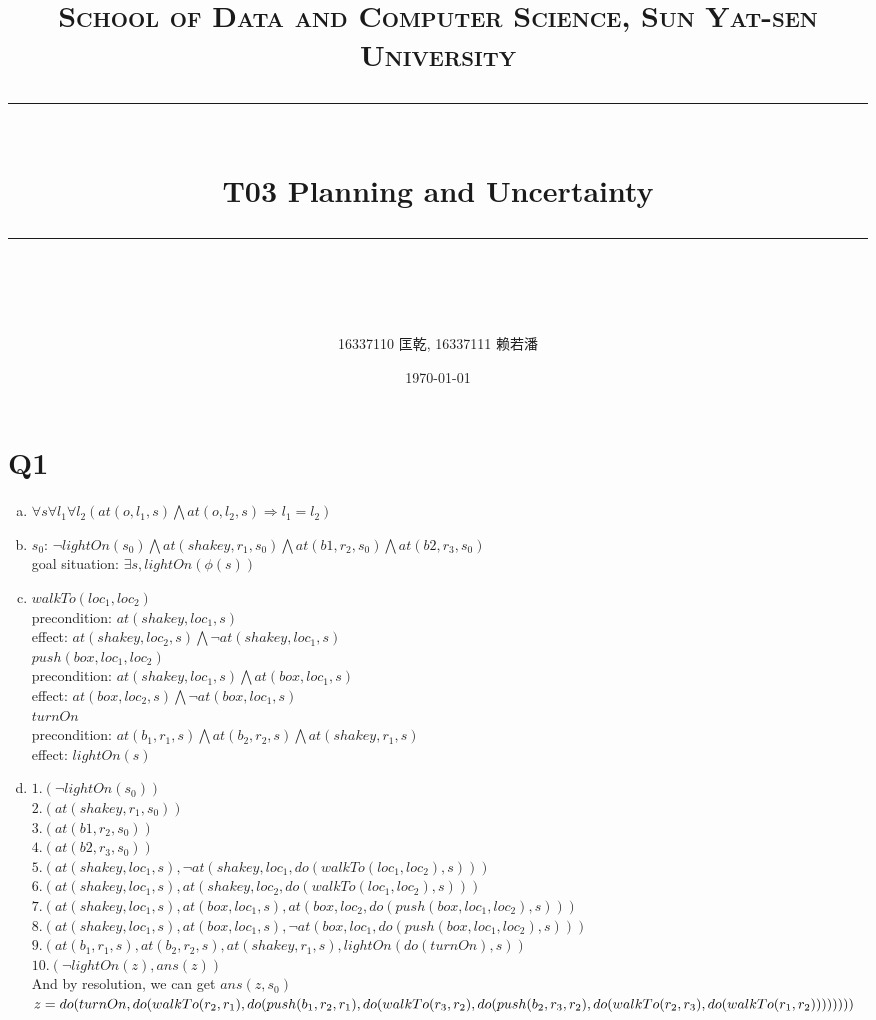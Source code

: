 \documentclass[a4paper, 11pt]{article}
\title{
\normalfont \normalsize
\textsc{School of Data and Computer Science, Sun Yat-sen University} \\ [25pt] %
\rule{\textwidth}{0.5pt} \\[0.4cm] %
\huge  T03 Planning and Uncertainty\\ %
\rule{\textwidth}{2pt} \\[0.5cm] %
\author{16337110 匡乾, 16337111 赖若潘}
\date{\normalsize\today}
}
\begin{document}
\maketitle
\tableofcontents
\newpage
\section{Q1}
\begin{enumerate}[(a)]
  \item
   $\forall s\forall l_1\forall l_2(at(o,l_1,s) \bigwedge at(o,l_2,s) \Rightarrow l_1 = l_2)$
  \item
  $s_0$: $\lnot lightOn(s_0) \bigwedge at(shakey,r_1,s_0) \bigwedge at(b1,r_2,s_0) \bigwedge at(b2,r_3,s_0)$\\
  goal situation: $\exists s,lightOn(\phi (s))$

  \item
$walkTo(loc_1,loc_2)$\\
	precondition: $at(shakey,loc_1,s)$\\
	effect: $at(shakey,loc_2,s) \bigwedge \lnot at(shakey,loc_1,s)$\\

$push(box,loc_1,loc_2)$\\
	precondition: $at(shakey,loc_1,s) \bigwedge at(box,loc_1,s)$\\
	effect: $at(box,loc_2,s) \bigwedge \lnot at(box,loc_1,s)$\\

$turnOn$\\
	precondition: $at(b_1,r_1,s) \bigwedge at(b_2,r_2,s) \bigwedge at(shakey,r_1,s)$\\
	effect: $lightOn(s)$

  \item
  $1.(\lnot lightOn(s_0))$\\
  $2.(at(shakey,r_1,s_0))$\\
  $3.(at(b1,r_2,s_0))$\\
  $4.(at(b2,r_3,s_0))$\\
  $5.(at(shakey,loc_1,s),\lnot at(shakey,loc_1,do(walkTo(loc_1,loc_2),s)))$\\
  $6.(at(shakey,loc_1,s),at(shakey,loc_2,do(walkTo(loc_1,loc_2),s)))$\\
  $7.(at(shakey,loc_1,s),at(box,loc_1,s),at(box,loc_2,do(push(box,loc_1,loc_2),s)))$\\
  $8.(at(shakey,loc_1,s),at(box,loc_1,s),\lnot at(box,loc_1,do(push(box,loc_1,loc_2),s)))$\\
  $9.(at(b_1,r_1,s),at(b_2,r_2,s),at(shakey,r_1,s),lightOn(do(turnOn),s))$\\
  $10.(\lnot lightOn(z),ans(z))$\\
  And by resolution, we can get $ans(z,s_0)$\\
  $z = do(turnOn,do(walkTo(r_2,r_1),do(push(b_1,r_2,r_1),do(walkTo(r_3,r_2),\\
  do(push(b_2,r_3,r_2),do(walkTo(r_2,r_3),do(walkTo(r_1,r_2))))))))$\\

\end{enumerate}
\end{document}
